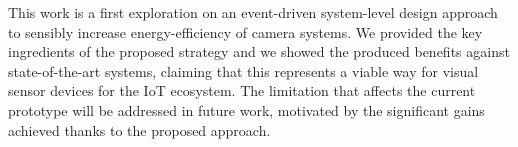 \documentclass[journal]{IEEEtran}
\begin{document}
This work is a first exploration on an event-driven system-level design approach to sensibly increase energy-efficiency of camera systems. We provided the key ingredients of the proposed strategy and we showed the produced benefits against state-of-the-art systems, claiming that this represents a viable way for visual sensor devices for the IoT ecosystem. The limitation that affects the current prototype will be addressed in future work, motivated by the significant gains achieved thanks to the proposed approach.    










%
\end{document}
